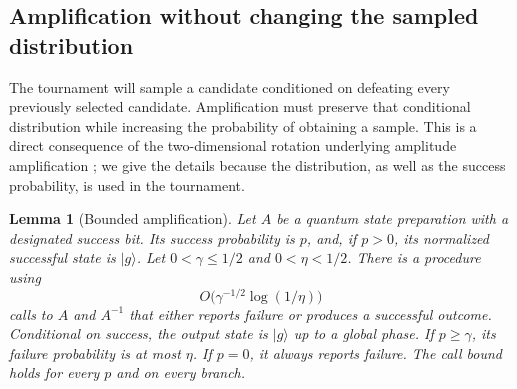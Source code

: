 \documentclass[11pt]{article}
\newtheorem{lemma}[theorem]{Lemma}
\theoremstyle{definition}
\begin{document}
\subsection{Amplification without changing the sampled distribution}

The tournament will sample a candidate conditioned on defeating every
previously selected candidate. Amplification must preserve that
conditional distribution while increasing the probability of obtaining
a sample. This is a direct consequence of the
two-dimensional rotation underlying amplitude amplification
\cite{BBHT98,BHMT02}; we give the details because the distribution,
as well as the success probability, is used in the tournament.

\begin{lemma}[Bounded amplification]\label{lem:amplification}
Let $A$ be a quantum state preparation with a designated success bit.
Its success probability is $p$, and, if $p>0$, its normalized successful
state is $\lvert g\rangle$. Let $0<\gamma\le1/2$ and $0<\eta<1/2$.
There is a procedure using
\[
 O\bigl(\gamma^{-1/2}\log(1/\eta)\bigr)
\]
calls to $A$ and $A^{-1}$ that either reports failure or produces a
successful outcome. Conditional on success, the output state is
$\lvert g\rangle$ up to a global phase. If $p\ge\gamma$, its failure
probability is at most $\eta$. If $p=0$, it always reports failure.
The call bound holds for every $p$ and on every branch.
\end{lemma}
\end{document}
